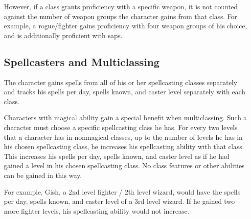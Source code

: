 However, if a class grants proficiency with a specific weapon, it is not counted against the number of weapon groups the character gains from that class.
For example, a rogue/fighter gains proficiency with four weapon groups of his choice, and is additionally proficient with saps.

\subsection{Spellcasters and Multiclassing}\label{Spellcasters and Multiclassing}
The character gains spells from all of his or her spellcasting classes separately and tracks his spells per day, spells known, and caster level separately with each class.

Characters with magical ability gain a special benefit when multiclassing.
Such a character must choose a specific spellcasting class he has.
For every two levels that a character has in nonmagical classes, up to the number of levels he has in his chosen spellcasting class, he increases his spellcasting ability with that class.
This increases his spells per day, spells known, and caster level as if he had gained a level in his chosen spellcasting class.
No class features or other abilities can be gained in this way.


For example, Gish, a 2nd level fighter / 2th level wizard, would have the spells per day, spells known, and caster level of a 3rd level wizard.
If he gained two more fighter levels, his spellcasting ability would not increase.
